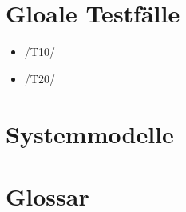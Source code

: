 \documentclass[a4paper]{scrreprt}
\begin{document}
\chapter{Gloale Testfälle}
\begin{itemize}
\item /T10/ 
\item /T20/

\end{itemize}

\chapter{Systemmodelle}

\chapter{Glossar}
 

 
\end{document}
